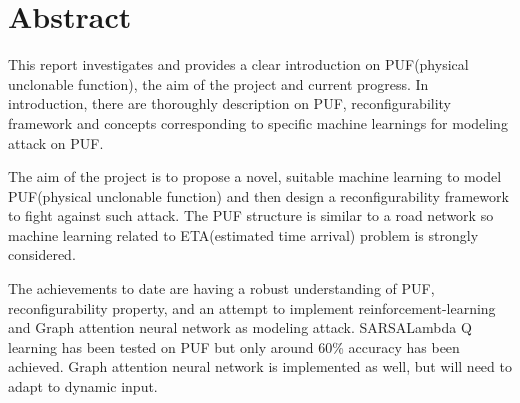 \chapter*{\Large \center Abstract}
\setlength{\parskip}{\baselineskip}%
\setlength{\parindent}{0pt}%

This report investigates and provides a clear introduction on PUF(physical unclonable function),
the aim of the project and current progress. In introduction, there are thoroughly description on
PUF, reconfigurability framework and concepts corresponding to specific machine learnings
for modeling attack on PUF.

The aim of the project is to propose a novel, suitable machine learning to model PUF(physical
unclonable function) and then design a reconfigurability framework to fight against such
attack. The PUF structure is similar to a road network so machine learning related to
ETA(estimated time arrival) problem is strongly considered.

The achievements to date are having a robust understanding of PUF, reconfigurability property,
and an attempt to implement reinforcement-learning and Graph attention neural network as modeling attack. SARSALambda Q
learning has been tested on PUF but only around 60\% accuracy has been achieved. Graph attention neural network
is implemented as well, but will need to adapt to dynamic input.
